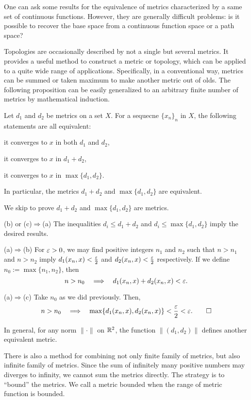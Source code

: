 \documentclass{../../large}
\begin{document}
One can ask some results for the equivalence of metrics characterized by a same set of continuous functions.
However, they are generally difficult problems: is it possible to recover the base space from a continuous function space or a path space?


Topologies are occasionally described by not a single but several metrics.
It provides a useful method to construct a metric or topology, which can be applied to a quite wide range of applications.
Specifically, in a conventional way, metrics can be summed or taken maximum to make another metric out of olds.
The following proposition can be easily generalized to an arbitrary finite number of metrics by mathematical induction.

\begin{prop}
Let $d_1$ and $d_2$ be metrics on a set $X$.
For a sequecne $\{x_n\}_n$ in $X$, the following statements are all equivalent:
\begin{parts}
\item it converges to $x$ in both $d_1$ and $d_2$,
\item it converges to $x$ in $d_1+d_2$,
\item it converges to $x$ in $\max\{d_1,d_2\}$.
\end{parts}
In particular, the metrics $d_1+d_2$ and $\max\{d_1,d_2\}$ are equivalent.
\end{prop}
\begin{pf}
We skip to prove $d_1+d_2$ and $\max\{d_1,d_2\}$ are metrics.

(b) or (c)$\Rightarrow$(a)
The inequalities $d_i\le d_1+d_2$ and $d_i\le\max\{d_1,d_2\}$ imply the desired results.

(a)$\Rightarrow$(b)
For $\varepsilon>0$, we may find positive integers $n_1$ and $n_2$ such that $n>n_1$ and $n>n_2$ imply $d_1(x_n,x)<\frac{\varepsilon}2$ and $d_2(x_n,x)<\frac{\varepsilon}2$ respectively.
If we define $n_0:=\max\{n_1,n_2\}$, then
\[n>n_0\impl d_1(x_n,x)+d_2(x_n,x)<\e.\]

(a)$\Rightarrow$(c)
Take $n_0$ as we did previously.
Then,
\[n>n_0\impl\max\{d_1(x_n,x),d_2(x_n,x)\}<\frac\e2<\e.\qedhere\]
\end{pf}

\begin{rmk}
In general, for any norm $\|\cdot\|$ on $\mathbb{R}^2$, the function $\|(d_1,d_2)\|$ defines another equivalent metric.
\end{rmk}

There is also a method for combining not only finite family of metrics, but also infinite family of metrics.
Since the sum of infinitely many positive numbers may diverges to infinity, we cannot sum the metrics directly.
The strategy is to ``bound'' the metrics.
We call a metric bounded when the range of metric function is bounded.
\end{document}
